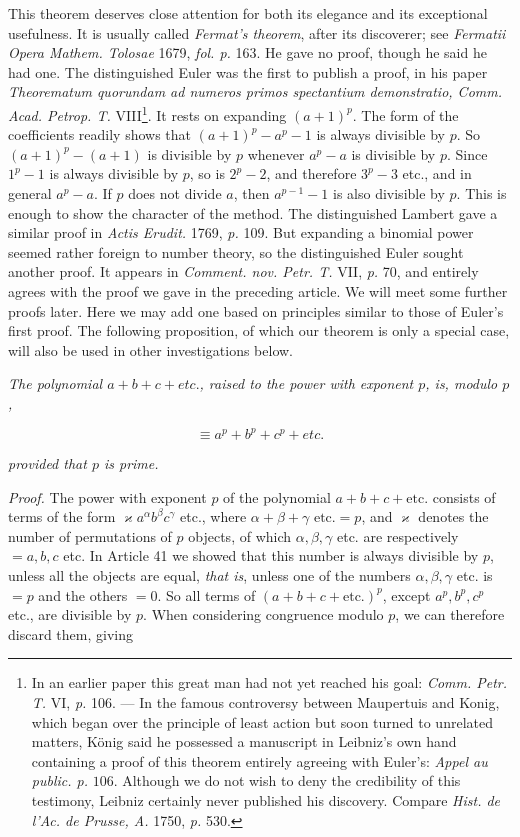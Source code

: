 This theorem deserves close attention for both its elegance and its exceptional usefulness. It is usually called \emph{Fermat's theorem}, after its discoverer; see \emph{Fermatii Opera Mathem. Tolosae} 1679, \emph{fol. p.} 163. He gave no proof, though he said he had one. The distinguished Euler was the first to publish a proof, in his paper \emph{Theorematum quorundam ad numeros primos spectantium demonstratio, Comm. Acad. Petrop. T.} VIII\begingroup\renewcommand{\thefootnote}{*)}\footnote{In an earlier paper this great man had not yet reached his goal: \emph{Comm. Petr. T.} VI, \emph{p.} 106. --- In the famous controversy between Maupertuis and Konig, which began over the principle of least action but soon turned to unrelated matters, K\"onig said he possessed a manuscript in Leibniz's own hand containing a proof of this theorem entirely agreeing with Euler's: \emph{Appel au public. p.} $106$. Although we do not wish to deny the credibility of this testimony, Leibniz certainly never published his discovery. Compare \emph{Hist. de l'Ac. de Prusse, A.} 1750, \emph{p.} 530.}\endgroup. It rests on expanding $(a+1)^p$. The form of the coefficients readily shows that $(a+1)^p-a^p-1$ is always divisible by $p$. So $(a+1)^p-(a+1)$ is divisible by $p$ whenever $a^p-a$ is divisible by $p$. Since $1^p-1$ is always divisible by $p$, so is $2^p-2$, and therefore $3^p-3$ etc., and in general $a^p-a$. If $p$ does not divide $a$, then $a^{p-1}-1$ is also divisible by $p$. This is enough to show the character of the method. The distinguished Lambert gave a similar proof in \emph{Actis Erudit.} 1769,
\emph{p.} 109. But expanding a binomial power seemed rather foreign to number theory, so the distinguished Euler sought another proof. It appears in \emph{Comment. nov. Petr. T.} VII, \emph{p.} 70, and entirely agrees with the proof we gave in the preceding article. We will meet some further proofs later. Here we may add one based on principles similar to those of Euler's first proof. The following proposition, of which our theorem is only a special case, will also be used in other investigations below.


\emph{The polynomial $a+b+c+\mathit{etc.}$, raised to the power with exponent $p$, is, modulo $p$,}

\[\equiv a^p+b^p+c^p+\mathit{etc.}\]

\noindent\emph{provided that $p$ is prime.}

\emph{Proof.} The power with exponent $p$ of the polynomial $a+b+c+\text{etc.}$ consists of terms of the form $\varkappa a^\alpha b^\beta c^\gamma$ etc., where $\alpha+\beta+\gamma\text{ etc.}=p$, and $\varkappa$ denotes the number of permutations of $p$ objects, of which $\alpha,\beta,\gamma$ etc. are respectively $=a,b,c$ etc. In Article 41 we showed that this number is always divisible by $p$, unless all the objects are equal, \emph{that is}, unless one of the numbers $\alpha,\beta,\gamma$ etc. is $=p$ and the others $=0$. So all terms of $(a+b+c+\text{etc.})^p$, except $a^p,b^p,c^p$ etc., are divisible by $p$. When considering congruence modulo $p$, we can therefore discard them, giving

